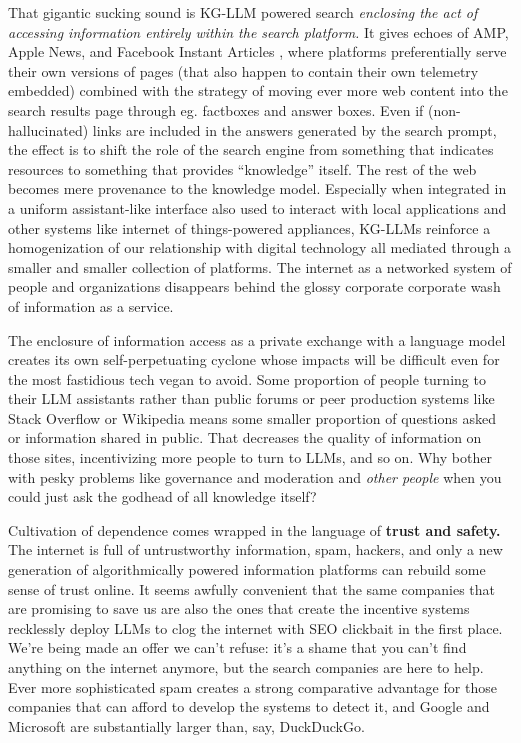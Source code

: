 \documentclass{article}
\begin{document}
That gigantic sucking sound is KG-LLM powered search \emph{enclosing the
act of accessing information entirely within the search platform.} It
gives echoes of AMP, Apple News, and Facebook Instant Articles \cite{ampletterLetterGoogleAMP2018, bohnGooglePlanMake2018} , where
platforms preferentially serve their own versions of pages (that also
happen to contain their own telemetry embedded) combined with the
strategy of moving ever more web content into the search results page
through eg. factboxes and answer boxes. Even if (non-hallucinated) links are included
in the answers generated by the search prompt, the effect is to shift
the role of the search engine from something that indicates resources to
something that provides ``knowledge'' itself. The rest of the web
becomes mere provenance to the knowledge model. Especially when
integrated in a uniform assistant-like interface also used to interact
with local applications and other systems like internet of
things-powered appliances, KG-LLMs reinforce a homogenization of our
relationship with digital technology all mediated through a smaller and
smaller collection of platforms. The internet as a networked system of
people and organizations disappears behind the glossy corporate
corporate wash of information as a service.

The enclosure of information access as a private exchange with a
language model creates its own self-perpetuating cyclone whose impacts
will be difficult even for the most fastidious tech vegan to avoid. Some
proportion of people turning to their LLM assistants rather than public
forums or peer production systems like Stack Overflow or Wikipedia means
some smaller proportion of questions asked or information shared in
public. That decreases the quality of information on those sites,
incentivizing more people to turn to LLMs, and so on. Why bother with
pesky problems like governance and moderation and \emph{other people}
when you could just ask the godhead of all knowledge itself?

Cultivation of dependence comes wrapped in the language of \textbf{trust
and safety.} The internet is full of untrustworthy information, spam,
hackers, and only a new generation of algorithmically powered
information platforms can rebuild some sense of trust online. It seems
awfully convenient that the same companies that are promising to save us
are also the ones that create the incentive systems recklessly deploy
LLMs to clog the internet with SEO clickbait in the first place. We're
being made an offer we can't refuse: it's a shame that you can't find
anything on the internet anymore, but the search companies are here to
help. Ever more sophisticated spam creates a strong comparative
advantage for those companies that can afford to develop the systems to
detect it, and Google and Microsoft are substantially larger than, say,
DuckDuckGo.
\end{document}
